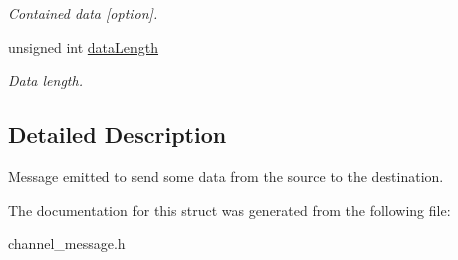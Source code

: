 \begin{DoxyCompactItemize}
\begin{DoxyCompactList}\small\item\em Contained data \mbox{[}option\mbox{]}. \end{DoxyCompactList}\item 
\hypertarget{structchannelMessageSend_ad573a8ab7177be1cacd48f96398c8701}{unsigned int \hyperlink{structchannelMessageSend_ad573a8ab7177be1cacd48f96398c8701}{data\-Length}}\label{structchannelMessageSend_ad573a8ab7177be1cacd48f96398c8701}

\begin{DoxyCompactList}\small\item\em Data length. \end{DoxyCompactList}\end{DoxyCompactItemize}


\subsection{Detailed Description}
Message emitted to send some data from the source to the destination. 

The documentation for this struct was generated from the following file\-:\begin{DoxyCompactItemize}
\item 
channel\-\_\-message.\-h\end{DoxyCompactItemize}
